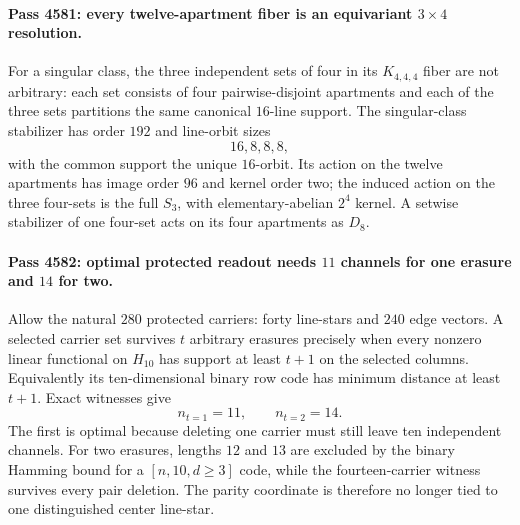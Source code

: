 \paragraph{Pass 4581: every twelve-apartment fiber is an equivariant $3\times4$ resolution.}
For a singular class, the three independent sets of four in its
$K_{4,4,4}$ fiber are not arbitrary: each set consists of four pairwise-disjoint
apartments and each of the three sets partitions the same canonical $16$-line
support.  The singular-class stabilizer has order $192$ and line-orbit sizes
\[
 16,8,8,8,
\]
with the common support the unique $16$-orbit.  Its action on the twelve
apartments has image order $96$ and kernel order two; the induced action on the
three four-sets is the full $S_3$, with elementary-abelian $2^4$ kernel.  A
setwise stabilizer of one four-set acts on its four apartments as $D_8$.

\paragraph{Pass 4582: optimal protected readout needs $11$ channels for one erasure and $14$ for two.}
Allow the natural $280$ protected carriers: forty line-stars and $240$ edge
vectors.  A selected carrier set survives $t$ arbitrary erasures precisely when
every nonzero linear functional on $H_{10}$ has support at least $t+1$ on the
selected columns.  Equivalently its ten-dimensional binary row code has minimum
distance at least $t+1$.  Exact witnesses give
\[
 \boxed{n_{t=1}=11},\qquad \boxed{n_{t=2}=14}.
\]
The first is optimal because deleting one carrier must still leave ten
independent channels.  For two erasures, lengths $12$ and $13$ are excluded by
the binary Hamming bound for a $[n,10,d\ge3]$ code, while the fourteen-carrier
witness survives every pair deletion.  The parity coordinate is therefore no
longer tied to one distinguished center line-star.

